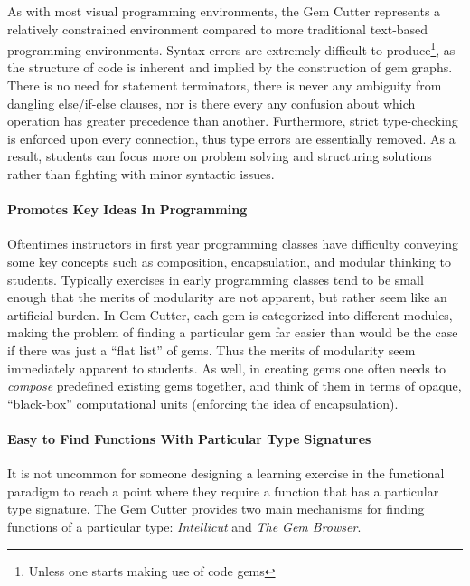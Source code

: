 As with most visual programming environments, the Gem Cutter represents a relatively constrained environment compared to more traditional text-based programming environments.  Syntax errors are extremely difficult to produce\footnote{Unless one starts making use of code gems}, as the structure of code is inherent and implied by the construction of gem graphs.  There is no need for statement terminators, there is never any ambiguity from dangling else/if-else clauses, nor is there every any confusion about which operation has greater precedence than another.  Furthermore, strict type-checking is enforced upon every connection, thus type errors are essentially removed.  As a result, students can focus more on problem solving and structuring solutions rather than fighting with minor syntactic issues.

\paragraph{Promotes Key Ideas In Programming}

Oftentimes instructors in first year programming classes have difficulty conveying some key concepts such as composition, encapsulation, and modular thinking to students.  Typically exercises in early programming classes tend to be small enough that the merits of modularity are not apparent, but rather seem like an artificial burden.  In Gem Cutter, each gem is categorized into different modules, making the problem of finding a particular gem far easier than would be the case if there was just a ``flat list'' of gems.  Thus the merits of modularity seem immediately apparent to students.  As well, in creating gems one often needs to \emph{compose} predefined existing gems together, and think of them in terms of opaque, ``black-box'' computational units (enforcing the idea of encapsulation).

\paragraph{Easy to Find Functions With Particular Type Signatures}

It is not uncommon for someone designing a learning exercise in the functional paradigm to reach a point where they require a function that has a particular type signature.  The Gem Cutter provides two main mechanisms for finding functions of a particular type: \emph{Intellicut} and \emph{The Gem Browser}.  

